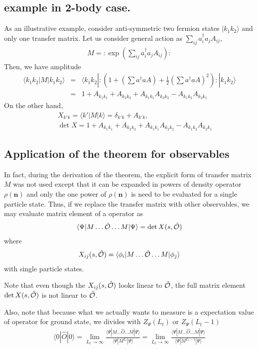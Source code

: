 \documentclass[10pt]{book}
\def\bm{\boldsymbol}
\newcommand{\bea}{\begin{eqnarray}}
\newcommand{\eea}{\end{eqnarray}}
\newcommand{\no}{\nonumber \\}
\def\vn{{\bm n}}
\def\la{\langle}
\def\ra{\rangle}
\begin{document}
\subsection{example in 2-body case.}
As an illustrative example, consider anti-symmetric two fermion states $|k_1 k_2\ra$
and only one transfer matrix. 
Let us consider general action as $\sum_{ij} a^\dagger_i a_j A_{ij}$,
\bea 
M=:\exp(\sum_{ij} a^\dagger_i a_j A_{ij}):
\eea 
Then, we have amplitude
\bea 
\la k_1 k_2|M|k_1 k_2\ra 
&= &\la k_1 k_2|:\left(
 1+(\sum a^\dagger a A)+\frac{1}{2}(\sum a^\dagger a A)^2 
 \right): |k_1 k_2\ra
 \no &=& 
1+A_{k_1 k_1}+A_{k_2 k_2}+A_{k_1k_1}A_{k_2k_2}-A_{k_1k_2}A_{k_2k_1} 
\eea 
On the other hand, 
\bea 
& &X_{k' k}= \la k'|M|k\ra =\delta_{k' k}+A_{k' k},\no 
& &\det X=1+A_{k_1 k_1}+A_{k_2 k_2}+A_{k_1k_1}A_{k_2k_2}-A_{k_1k_2}A_{k_2k_1} 
\eea 

\subsection{Application of the theorem for observables}

In fact, during the derivation of the theorem, the explicit form of transfer matrix $M$ was not 
used except that it can be expanded in powers of density operator $\rho(\vn)$ and
only the one power of $\rho(\vn)$ is need to be evaluated for a single particle state. 
Thus, if we replace the transfer matrix with other observables, we may evaluate 
matrix element of a operator as
\bea 
\la \Psi| M\dots \hat{\cal O}\dots M|\Psi\ra =\det X(s,\hat{\cal O})
\eea 
where 
\bea 
X_{ij}(s,\hat{\cal O})=\la \phi_i| M\dots \hat{\cal O}\dots M |\phi_j\ra 
\eea 
with single particle states. 

Note that even though the $X_{ij}(s,\hat{\cal O})$ looks linear to $\hat{\cal O}$,
the full matrix element $\det X(s,\hat{\cal O})$ is not linear to $\hat{\cal O}$. 

Also, note that because what we actually wants to measure is a expectation value of operator for 
ground state, we divides with $Z_\Psi(L_t)$ or $Z_\Psi(L_t-1)$
\bea 
\la 0|\hat{O}|0\ra =\lim_{L_t\to \infty} \frac{\la \Psi|M\dots \hat{O}\dots M|\Psi\ra}
                                            {\la \Psi|M^{L_t}|\Psi\ra} 
                   =\lim_{L_t\to \infty} \frac{\la \Psi|M\dots \hat{O}\dots M|\Psi\ra}
                   {\la \Psi|M^{L_t-1}|\Psi\ra}                                                           
\eea 
 
\end{document}
